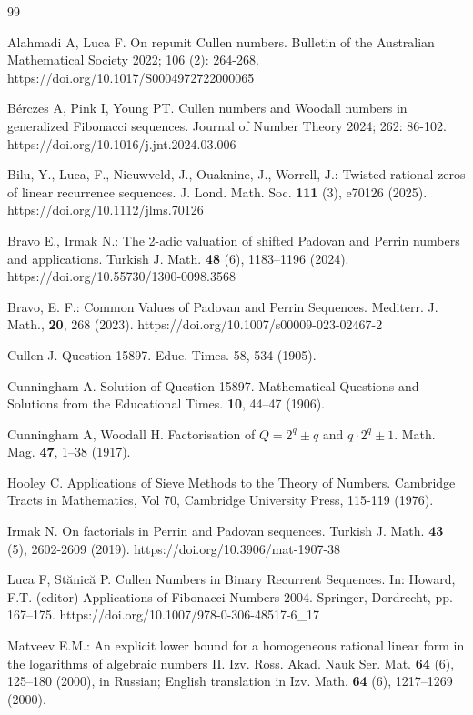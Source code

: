 \documentclass[11pt,a4paper]{article}
\numberwithin{equation}{section}
\numberwithin{table}{section}
\numberwithin{figure}{section}
\begin{document}
\begin{thebibliography}{99}

 Alahmadi A, Luca F. On repunit Cullen numbers. Bulletin of the Australian Mathematical Society 2022; 106 (2): 264-268. https://doi.org/10.1017/S0004972722000065

 B\'erczes A, Pink I, Young PT. Cullen numbers and Woodall numbers in generalized Fibonacci sequences. Journal of Number Theory 2024; 262: 86-102. https://doi.org/10.1016/j.jnt.2024.03.006

 Bilu, Y., Luca, F., Nieuwveld, J., Ouaknine, J., Worrell, J.: Twisted rational zeros of linear recurrence sequences. J. Lond. Math. Soc. \textbf{111} (3), e70126 (2025). https://doi.org/10.1112/jlms.70126
	
	Bravo E., Irmak N.: The 2-adic valuation of shifted Padovan and Perrin numbers and applications. Turkish J. Math. {\bf 48} (6), 1183--1196 (2024). https://doi.org/10.55730/1300-0098.3568
	    
Bravo, E. F.: Common Values of Padovan and Perrin Sequences. Mediterr. J. Math., \textbf{20}, 268 (2023). https://doi.org/10.1007/s00009-023-02467-2

 Cullen J. Question 15897. Educ. Times. 58, 534 (1905).

 Cunningham A. Solution of Question 15897. Mathematical Questions and Solutions from the Educational Times. {\bf 10}, 44--47 (1906).

 Cunningham A, Woodall H. Factorisation of $Q=2^{q}\pm q$ and $q\cdot 2^{q} \pm 1$. Math. Mag. {\bf 47}, 1--38 (1917).

 Hooley C. Applications of Sieve Methods to the Theory of Numbers. Cambridge Tracts in Mathematics, Vol 70, Cambridge University Press, 115-119  (1976).
    
 Irmak N. On factorials in Perrin and Padovan sequences. Turkish J. Math. {\bf 43} (5), 2602-2609 (2019). https://doi.org/10.3906/mat-1907-38

 Luca F, St\u{a}nic\u{a} P. Cullen Numbers in Binary Recurrent Sequences. In: Howard, F.T. (editor) Applications of Fibonacci Numbers 2004. Springer, Dordrecht, pp. 167--175. https://doi.org/10.1007/978-0-306-48517-6\_17

 Matveev E.M.: An explicit lower bound for a homogeneous rational linear form in the logarithms of algebraic numbers II. Izv. Ross. Akad. Nauk Ser. Mat. {\bf 64} (6), 125--180 (2000), in Russian; English translation in Izv. Math. {\bf 64} (6), 1217--1269 (2000).


\end{thebibliography}
\end{document}
